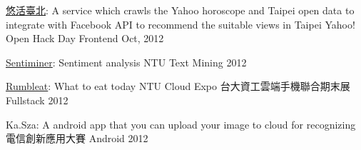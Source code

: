 \begin{cvhonors}
  \cvhonor
    {\href{http://yoho-taipei.herokuapp.com}{悠活臺北}: \textmd{A service which crawls the Yahoo horoscope and Taipei open data to integrate with Facebook API to recommend the suitable views in Taipei}} %
    {Yahoo! Open Hack Day} %
    {Frontend} %
    {Oct, 2012} %

  \cvhonor
    {\href{https://sentiminer.herokuapp.com}{Sentiminer}: \textmd{Sentiment analysis}} %
    {NTU} %
    {Text Mining} %
    {2012} %

  \cvhonor
    {\href{http://rumbleat.herokuapp.com/}{Rumbleat}: \textmd{What to eat today}} %
    {NTU Cloud Expo 台大資工雲端手機聯合期末展} %
    {Fullstack} %
    {2012} %

  \cvhonor
    {Ka.Sza: \textmd{A android app that you can upload your image to cloud for recognizing}} %
    {電信創新應用大賽} %
    {Android} %
    {2012} %



\end{cvhonors}

